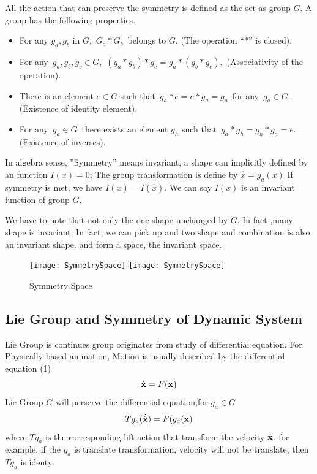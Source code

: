 All the action that can preserve the symmetry is defined as the set as group $G$.
A group has the following properties.
\begin{itemize}
\item For any $g_a,g_b$ in $G$, \,$G_a*G_b$\, belongs to $G$. (The operation
``$*$'' is closed).

\item For any \,$g_a,g_b,g_c\in G$, \,$(g_a*g_b)*g_c=g_a*(g_b*g_c)$. \,(Associativity of
the operation).

\item There is an element $e\in G$ such that \,$g_a*e=e*g_a=g_a$\, for any
\,$g_a\in G$. (Existence of identity element).

\item For any \,$g_a\in G$\, there exists an element $g_h$ such that
\,$g_a*g_h=g_h*g_a=e$. \,(Existence of inverses).
\end{itemize}



In algebra sense, ''Symmetry'' means invariant, a shape can implicitly defined by an function $I(x)=0$;
The group transformation is define by $\hat{x}=g_a(x)$
If symmetry is met, we have $I(x)=I(\hat{x})$.
We can say $I(x)$ is an invariant function of group $G$.

We have to note that not only the one shape unchanged by $G$.
In fact ,many shape is invariant, 
In fact, we can pick up and two shape and combination is also an invariant shape. 
and form a space, the invariant space.


\begin{figure}[!htbp]
  \begin{center}
    \leavevmode
    \ifpdf
      \texttt{[image: SymmetrySpace]}
    \else
      \texttt{[image: SymmetrySpace]}
    \fi
    \caption{Symmetry Space}
    \label{fig:symmetry Space}
\end{center}
\end{figure}





\subsection{Lie Group and Symmetry of Dynamic System}
Lie Group is continues group originates from study of differential equation.
For Physically-based animation,
Motion is usually described by the differential equation (1)
\begin{equation}
	\dot{\mathbf{x}}=F(\mathbf{x})
\end{equation}
Lie Group $G$ will perserve the differential equation,for $g_a \in G$ 
\[
Tg_a(\dot{\hat{\mathbf{x}}})=F(g_a(\mathbf{x})
\]
where $Tg_a$ is the corresponding lift action that transform the velocity $\dot{\mathbf{x}}$.
for example, if the $g_a$ is translate transformation, velocity will not be translate, then $Tg_a$ is identy.






